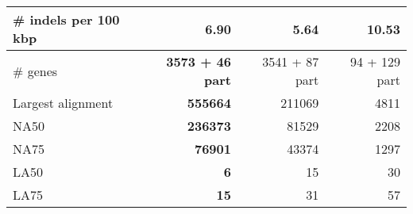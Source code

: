 \documentclass[12pt,a4paper]{article}
\begin{document}
\begin{table}[ht]
\begin{center}
\begin{tabular}{|l*{3}{|r}|}
\# indels per 100 kbp & 6.90 & {\bf 5.64} & 10.53 \\ \hline
\# genes & {\bf 3573 + 46 part} & 3541 + 87 part & 94 + 129 part \\ \hline
Largest alignment & {\bf 555664} & 211069 & 4811 \\ \hline
NA50 & {\bf 236373} & 81529 & 2208 \\ \hline
NA75 & {\bf 76901} & 43374 & 1297 \\ \hline
LA50 & {\bf 6} & 15 & 30 \\ \hline
LA75 & {\bf 15} & 31 & 57 \\ \hline
\end{tabular}
\end{center}
\end{table}
\end{document}
